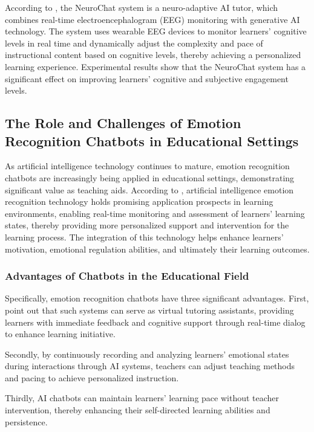 \documentclass{xum_review}
\begin{document}
According to \citet{baradari2025neurochatneuroadaptiveaichatbot}, the NeuroChat system is a
neuro-adaptive AI tutor, which combines real-time electroencephalogram (EEG)
monitoring with generative AI technology. The system uses wearable EEG devices
to monitor learners' cognitive levels in real time and dynamically adjust the
complexity and pace of instructional content based on cognitive levels, thereby
achieving a personalized learning experience. Experimental results show that the
NeuroChat system has a significant effect on improving learners' cognitive and
subjective engagement levels. 

\subsection{The Role and Challenges of Emotion Recognition Chatbots in Educational Settings}

As artificial intelligence technology continues to mature, emotion recognition
chatbots are increasingly being applied in educational settings, demonstrating
significant value as teaching aids. According to \citet{arsad2024integrating},
artificial intelligence emotion recognition technology
holds promising application prospects in learning environments, enabling
real-time monitoring and assessment of learners' learning states, thereby
providing more personalized support and intervention for the learning process.
The integration of this technology helps enhance learners' motivation, emotional
regulation abilities, and ultimately their learning outcomes.

\subsubsection{Advantages of Chatbots in the Educational Field}

Specifically, emotion recognition chatbots have three significant advantages.
First, \citet{siregar2024ai} point out that such systems can
serve as virtual tutoring assistants, providing learners with immediate feedback
and cognitive support through real-time dialog to enhance learning initiative. 

Secondly, by continuously recording and analyzing learners' emotional states
during interactions through AI systems, teachers can adjust teaching methods and
pacing to achieve personalized instruction. 

Thirdly, AI chatbots can maintain learners' learning pace without teacher
intervention, thereby enhancing their self-directed learning abilities and
persistence. 
\end{document}
